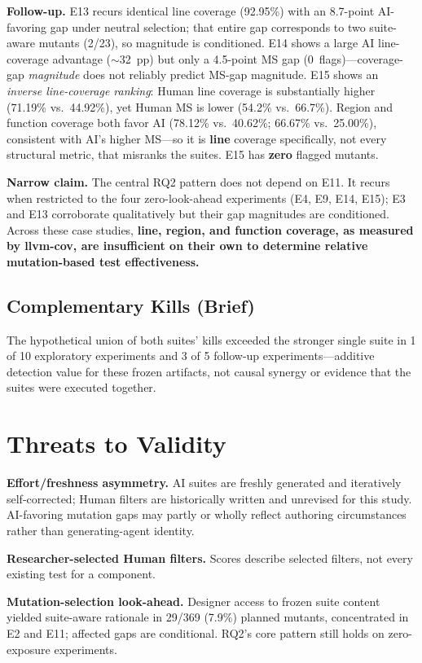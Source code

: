 \documentclass[10pt,conference,a4paper]{IEEEtran}
\begin{document}
\textbf{Follow-up.} E13 recurs identical line coverage (92.95\%) with an 8.7-point AI-favoring gap under neutral selection; that entire gap corresponds to two suite-aware mutants (2/23), so magnitude is conditioned. E14 shows a large AI line-coverage advantage ($\sim$32~pp) but only a 4.5-point MS gap (0~flags)---coverage-gap \emph{magnitude} does not reliably predict MS-gap magnitude. E15 shows an \emph{inverse line-coverage ranking}: Human line coverage is substantially higher (71.19\% vs.\ 44.92\%), yet Human MS is lower (54.2\% vs.\ 66.7\%). Region and function coverage both favor AI (78.12\% vs.\ 40.62\%; 66.67\% vs.\ 25.00\%), consistent with AI's higher MS---so it is \textbf{line} coverage specifically, not every structural metric, that misranks the suites. E15 has \textbf{zero} flagged mutants.

\textbf{Narrow claim.} The central RQ2 pattern does not depend on E11. It recurs when restricted to the four zero-look-ahead experiments (E4, E9, E14, E15); E3 and E13 corroborate qualitatively but their gap magnitudes are conditioned. Across these case studies, \textbf{line, region, and function coverage, as measured by llvm-cov, are insufficient on their own to determine relative mutation-based test effectiveness.}

\subsection{Complementary Kills (Brief)}
The hypothetical union of both suites' kills exceeded the stronger single suite in 1 of 10 exploratory experiments and 3 of 5 follow-up experiments---additive detection value for these frozen artifacts, not causal synergy or evidence that the suites were executed together.

\section{Threats to Validity}
\textbf{Effort/freshness asymmetry.} AI suites are freshly generated and iteratively self-corrected; Human filters are historically written and unrevised for this study. AI-favoring mutation gaps may partly or wholly reflect authoring circumstances rather than generating-agent identity.

\textbf{Researcher-selected Human filters.} Scores describe selected filters, not every existing test for a component.

\textbf{Mutation-selection look-ahead.} Designer access to frozen suite content yielded suite-aware rationale in 29/369 (7.9\%) planned mutants, concentrated in E2 and E11; affected gaps are conditional. RQ2's core pattern still holds on zero-exposure experiments.
\end{document}
